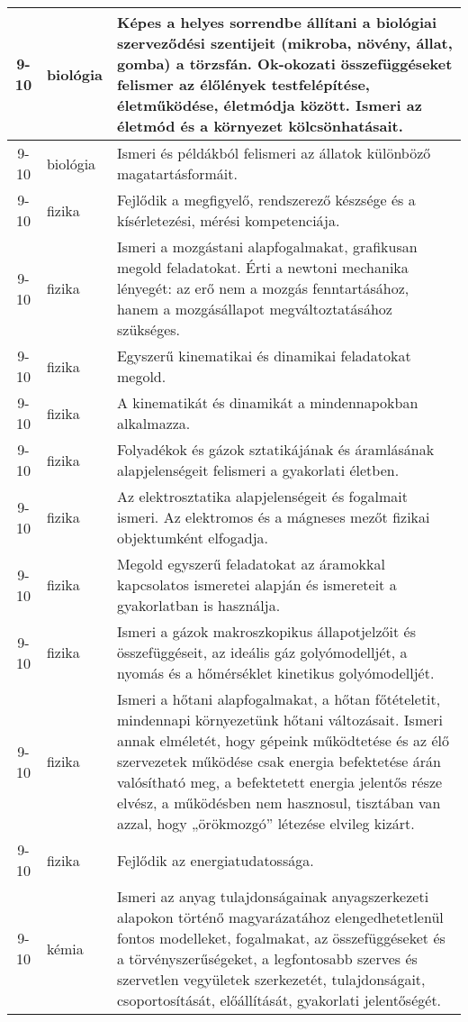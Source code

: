 \begin{small}
\begin{longtable}{c | p{2cm} |  p{11cm} }
              9-10 & biológia & Képes a helyes sorrendbe állítani a biológiai szerveződési szentijeit (mikroba, növény, állat, gomba) a törzsfán. Ok-okozati összefüggéseket felismer az élőlények testfelépítése, életműködése, életmódja között. Ismeri az életmód és a környezet kölcsönhatásait. \\ \hline
              9-10 & biológia & Ismeri és példákból felismeri az állatok különböző magatartásformáit. \\ \hline
              9-10 & fizika & Fejlődik a megfigyelő, rendszerező készsége és a kísérletezési, mérési kompetenciája. \\ \hline
              9-10 & fizika & Ismeri a mozgástani alapfogalmakat, grafikusan megold feladatokat. Érti a newtoni mechanika lényegét: az erő nem a mozgás fenntartásához, hanem a mozgásállapot megváltoztatásához szükséges. \\ \hline
              9-10 & fizika & Egyszerű kinematikai és dinamikai feladatokat megold. \\ \hline
              9-10 & fizika & A kinematikát és dinamikát a mindennapokban alkalmazza. \\ \hline
              9-10 & fizika & Folyadékok és gázok sztatikájának és áramlásának alapjelenségeit felismeri a gyakorlati életben. \\ \hline
              9-10 & fizika & Az elektrosztatika alapjelenségeit és fogalmait ismeri. Az elektromos és a mágneses mezőt fizikai objektumként elfogadja. \\ \hline
              9-10 & fizika & Megold egyszerű feladatokat az áramokkal kapcsolatos ismeretei alapján és ismereteit a gyakorlatban is használja. \\ \hline
              9-10 & fizika & Ismeri a gázok makroszkopikus állapotjelzőit és összefüggéseit, az ideális gáz golyómodelljét, a nyomás és a hőmérséklet kinetikus golyómodelljét. \\ \hline
              9-10 & fizika & Ismeri a hőtani alapfogalmakat, a hőtan főtételetit, mindennapi környezetünk hőtani változásait. Ismeri annak elméletét, hogy gépeink működtetése és az élő szervezetek működése csak energia befektetése árán valósítható meg, a befektetett energia jelentős része elvész, a működésben nem hasznosul, tisztában van azzal, hogy  „örökmozgó” létezése elvileg kizárt. \\ \hline
              9-10 & fizika & Fejlődik az energiatudatossága. \\ \hline
              9-10 & kémia & Ismeri az anyag tulajdonságainak anyagszerkezeti alapokon történő magyarázatához elengedhetetlenül fontos modelleket, fogalmakat, az összefüggéseket és a törvényszerűségeket, a legfontosabb szerves és szervetlen vegyületek szerkezetét, tulajdonságait, csoportosítását, előállítását, gyakorlati jelentőségét. \\ \hline

\end{longtable}
\end{small}

